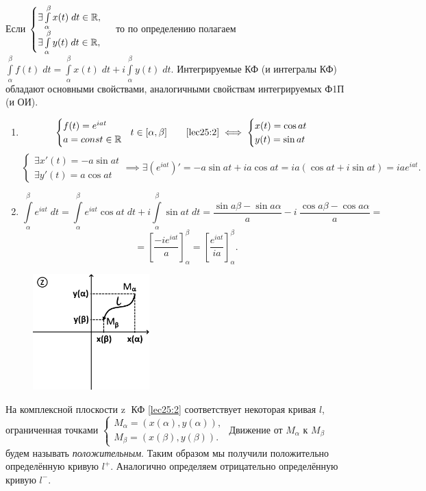 \documentclass[../../main.tex]{subfiles}
\begin{document}
Если $\begin{cases}
	\exists \int\limits_{\alpha}^{\beta} x(t)\;dt  \in \mathbb{R}, \\
	\exists \int\limits_{\alpha}^{\beta} y(t)\;dt  \in \mathbb{R},
\end{cases}$ то по определению полагаем
$\int\limits_{\alpha}^{\beta} f(t)\;dt = 
\int\limits_{\alpha}^{\beta} x(t)\;dt + i\int\limits_{\alpha}^{\beta} y(t)\;dt$.
Интегрируемые КФ (и интегралы КФ) обладают
основными свойствами, аналогичными 
свойствам интегрируемых Ф1П (и ОИ).
\begin{exmps}

\;

\begin{enumerate}
\item\[\begin{cases}
	f(t) = e^{iat} \\
	a = const \in \mathbb{R}
\end{cases}\!\! t \in [\alpha, \beta]
\qquad
\eqref{lec25:2} \iff 
\begin{cases}
	x(t) = \cos{at} \\
	y(t) = \sin{at}
\end{cases}  
\]
\[\begin{cases}
	\exists x'(t) = -a\sin{at}  \\
	\exists y'(t) = a\cos{at}
\end{cases}\implies \exists \left(e^{iat} \right)' = -a\sin{at} + ia\cos{at} =
 ia(\cos{at} + i\sin{at}) = iae^{iat}.
\]
\item\[
\int\limits_{\alpha}^{\beta}e^{iat}\;dt =
\int\limits_{\alpha}^{\beta}e^{iat}\cos{at}\;dt +
 i\int\limits_{\alpha}^{\beta}\sin{at}\;dt = 
 \frac{\sin{a\beta} - \sin{a\alpha}}{a} -   
 i\ \frac{\cos{a\beta} - \cos{a\alpha}}{a} = \]\[
= \left[ \frac{-i{e}^{iat}}{a} \right]_{\alpha}^{\beta}= 
\left[ \frac{{e}^{iat}}{ia} \right]_{\alpha}^{\beta}.
\]
\end{enumerate}
\end{exmps}

\begin{figure}
\includegraphics[width=0.4\textwidth]{lec25_1.png}
\end{figure}
На комплексной плоскости \textcircled{z}  КФ \eqref{lec25:2} соответствует
некоторая кривая $l$, ограниченная точками $
\begin{cases}
	M_{\alpha} = (x(\alpha), y(\alpha)), \\
	M_{\beta} = (x(\beta), y(\beta)).
\end{cases} $ Движение от $M_{\alpha}$ к $M_{\beta}$ будем называть 
\emph{положительным}. Таким образом мы получили положительно
определённую кривую $l^+$. Аналогично определяем отрицательно
определённую кривую $l^-$.
\end{document}
